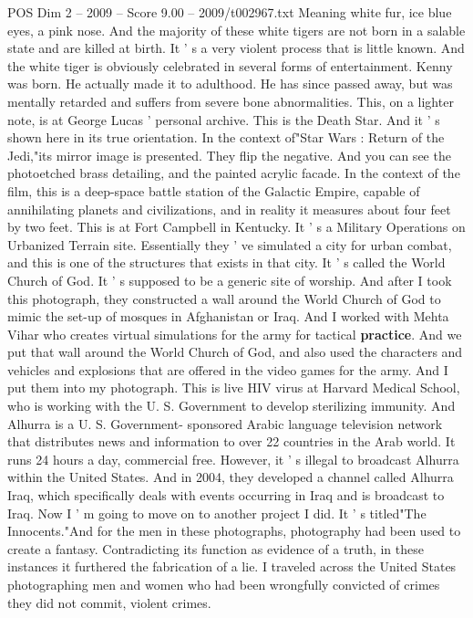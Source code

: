 \begin{textsample}{POS Dim 2 – 2009 – Score 9.00 – 2009/t002967.txt}
Meaning white fur, ice blue eyes, a pink nose.
And the majority of these white tigers are not born in a salable state and are killed at birth.
It ' s a very violent process that is little known.
And the white tiger is obviously celebrated in several forms of entertainment.
Kenny was born.
He actually made it to adulthood.
He has since passed away, but was mentally retarded and suffers from severe bone abnormalities.
This, on a lighter note, is at George Lucas ' personal archive.
This is the Death Star.
And it ' s shown here in its true orientation.
In the context of"Star Wars : Return of the Jedi,"its mirror image is presented.
They flip the negative.
And you can see the photoetched brass detailing, and the painted acrylic facade.
In the context of the film, this is a deep-space battle station of the Galactic Empire, capable of annihilating planets and civilizations, and in reality it measures about four feet by two feet.
This is at Fort Campbell in Kentucky.
It ' s a Military Operations on Urbanized Terrain site.
Essentially they ' ve simulated a city for urban combat, and this is one of the structures that exists in that city.
It ' s called the World Church of God.
It ' s supposed to be a generic site of worship.
And after I took this photograph, they constructed a wall around the World Church of God to mimic the set-up of mosques in Afghanistan or Iraq.
And I worked with Mehta Vihar who creates virtual simulations for the army for tactical \textbf{practice}.
And we put that wall around the World Church of God, and also used the characters and vehicles and explosions that are offered in the video games for the army.
And I put them into my photograph.
This is live HIV virus at Harvard Medical School, who is working with the U.
S.
Government to develop sterilizing immunity.
And Alhurra is a U.
S.
Government- sponsored Arabic language television network that distributes news and information to over 22 countries in the Arab world.
It runs 24 hours a day, commercial free.
However, it ' s illegal to broadcast Alhurra within the United States.
And in 2004, they developed a channel called Alhurra Iraq, which specifically deals with events occurring in Iraq and is broadcast to Iraq.
Now I ' m going to move on to another project I did.
It ' s titled"The Innocents."And for the men in these photographs, photography had been used to create a fantasy.
Contradicting its function as evidence of a truth, in these instances it furthered the fabrication of a lie.
I traveled across the United States photographing men and women who had been wrongfully convicted of crimes they did not commit, violent crimes.

\end{textsample}
